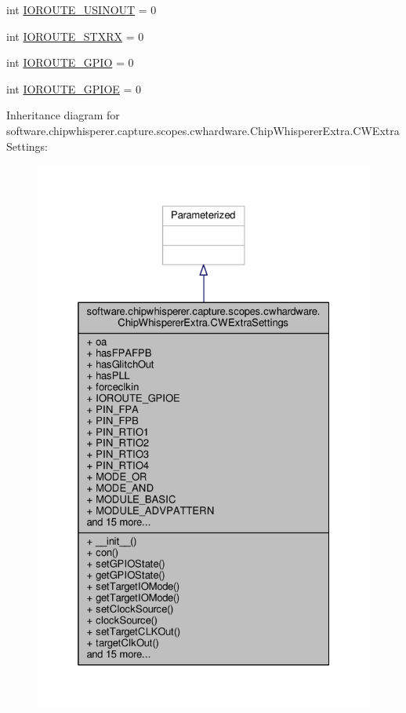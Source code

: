 \begin{DoxyCompactItemize}
\item 
int \hyperlink{classsoftware_1_1chipwhisperer_1_1capture_1_1scopes_1_1cwhardware_1_1ChipWhispererExtra_1_1CWExtraSettings_a2ad473339c1044585cbe68e1ff2a1100}{I\+O\+R\+O\+U\+T\+E\+\_\+\+U\+S\+I\+N\+O\+U\+T} = 0
\item 
int \hyperlink{classsoftware_1_1chipwhisperer_1_1capture_1_1scopes_1_1cwhardware_1_1ChipWhispererExtra_1_1CWExtraSettings_a7f7ac17c6fd112af10fcf8e29ad9ca91}{I\+O\+R\+O\+U\+T\+E\+\_\+\+S\+T\+X\+R\+X} = 0
\item 
int \hyperlink{classsoftware_1_1chipwhisperer_1_1capture_1_1scopes_1_1cwhardware_1_1ChipWhispererExtra_1_1CWExtraSettings_af8d51f2ee95a73d0fa9aaa5fceec5daa}{I\+O\+R\+O\+U\+T\+E\+\_\+\+G\+P\+I\+O} = 0
\item 
int \hyperlink{classsoftware_1_1chipwhisperer_1_1capture_1_1scopes_1_1cwhardware_1_1ChipWhispererExtra_1_1CWExtraSettings_a5f4196fc6544e4ca1543fe68a640dd1f}{I\+O\+R\+O\+U\+T\+E\+\_\+\+G\+P\+I\+O\+E} = 0
\end{DoxyCompactItemize}


Inheritance diagram for software.\+chipwhisperer.\+capture.\+scopes.\+cwhardware.\+Chip\+Whisperer\+Extra.\+C\+W\+Extra\+Settings\+:\nopagebreak
\begin{figure}[H]
\begin{center}
\leavevmode
\includegraphics[width=325pt]{dc/dee/classsoftware_1_1chipwhisperer_1_1capture_1_1scopes_1_1cwhardware_1_1ChipWhispererExtra_1_1CWExtraSettings__inherit__graph}
\end{center}
\end{figure}


